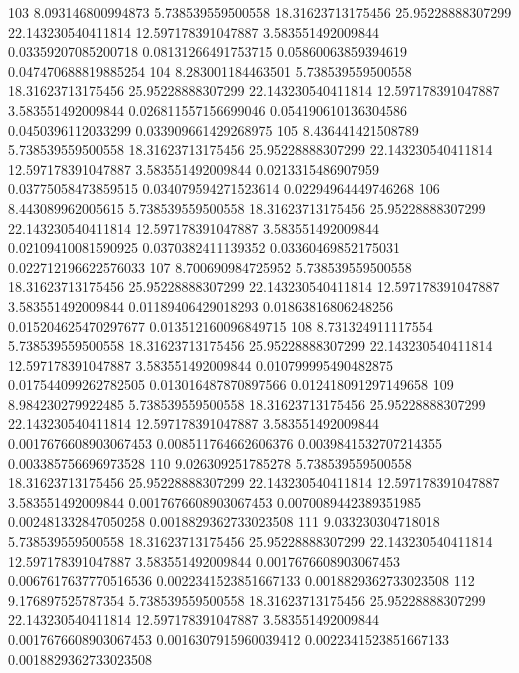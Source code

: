 {103 8.093146800994873 5.738539559500558 18.31623713175456 25.95228888307299 22.143230540411814 12.597178391047887 3.583551492009844 0.03359207085200718 0.08131266491753715 0.05860063859394619 0.047470688819885254
104 8.283001184463501 5.738539559500558 18.31623713175456 25.95228888307299 22.143230540411814 12.597178391047887 3.583551492009844 0.026811557156699046 0.054190610136304586 0.0450396112033299 0.033909661429268975
105 8.436441421508789 5.738539559500558 18.31623713175456 25.95228888307299 22.143230540411814 12.597178391047887 3.583551492009844 0.0213315486907959 0.03775058473859515 0.034079594271523614 0.02294964449746268
106 8.443089962005615 5.738539559500558 18.31623713175456 25.95228888307299 22.143230540411814 12.597178391047887 3.583551492009844 0.02109410081590925 0.0370382411139352 0.03360469852175031 0.022712196622576033
107 8.700690984725952 5.738539559500558 18.31623713175456 25.95228888307299 22.143230540411814 12.597178391047887 3.583551492009844 0.01189406429018293 0.01863816806248256 0.015204625470297677 0.013512160096849715
108 8.731324911117554 5.738539559500558 18.31623713175456 25.95228888307299 22.143230540411814 12.597178391047887 3.583551492009844 0.010799995490482875 0.017544099262782505 0.013016487870897566 0.012418091297149658
109 8.984230279922485 5.738539559500558 18.31623713175456 25.95228888307299 22.143230540411814 12.597178391047887 3.583551492009844 0.0017676608903067453 0.008511764662606376 0.0039841532707214355 0.003385756696973528
110 9.026309251785278 5.738539559500558 18.31623713175456 25.95228888307299 22.143230540411814 12.597178391047887 3.583551492009844 0.0017676608903067453 0.0070089442389351985 0.002481332847050258 0.0018829362733023508
111 9.033230304718018 5.738539559500558 18.31623713175456 25.95228888307299 22.143230540411814 12.597178391047887 3.583551492009844 0.0017676608903067453 0.0067617637770516536 0.0022341523851667133 0.0018829362733023508
112 9.176897525787354 5.738539559500558 18.31623713175456 25.95228888307299 22.143230540411814 12.597178391047887 3.583551492009844 0.0017676608903067453 0.0016307915960039412 0.0022341523851667133 0.0018829362733023508
}\tableexpivwaitmsciedaw
